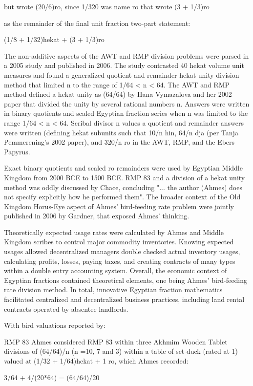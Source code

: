 \documentclass[12pt]{article}
\begin{document}
but wrote (20/6)ro, since 1/320 was name ro that wrote (3 + 1/3)ro

as the remainder of the final unit fraction two-part statement:

(1/8 + 1/32)hekat + (3 + 1/3)ro

The non-additive aspects of the AWT and RMP division problems were parsed in a 2005 study and published in 2006. The study contrasted 40 hekat volume unit measures and found a generalized quotient and remainder hekat unity division method that limited n to the range of 1/64 < n < 64. The AWT and RMP method defined a hekat unity as (64/64) by Hana Vymazalova and her 2002 paper that divided the unity by several rational numbers n. Answers were written in binary quotients and scaled Egyptian fraction series when n was limited to the range 1/64 < n < 64. Scribal divisor n values a quotient and remainder answers were written (defining hekat subunits such that 10/n hin, 64/n dja (per Tanja Pemmerening's 2002 paper), and 320/n ro in the AWT, RMP, and the Ebers Papyrus.

Exact binary quotients and scaled ro remainders were used by Egyptian Middle Kingdom from 2000 BCE to 1500 BCE. RMP 83 and a division of a hekat unity method was oddly discussed by Chace, concluding "... the author (Ahmes) does not specify explicitly how he performed them". The broader context of the Old Kingdom Horus-Eye aspect of Ahmes' bird-feeding rate problem were jointly published in 2006 by Gardner, that exposed Ahmes' thinking.

Theoretically expected usage rates were calculated by Ahmes and Middle Kingdom scribes to control major commodity inventories. Knowing expected usages allowed decentralized managers double checked actual inventory usages, calculating profits, losses, paying taxes, and creating contracts of many types within a double entry accounting system. Overall, the economic context of Egyptian fractions contained theoretical elements, one being Ahmes' bird-feeding rate division method. In total, innovative Egyptian fraction mathematics facilitated centralized and decentralized business practices, including land rental contracts operated by absentee landlords.

With bird valuations reported by:

RMP 83 Ahmes considered RMP 83 within three Akhmim Wooden Tablet divisions of (64/64)/n (n =10, 7 and 3) within a  table of set-duck (rated at 1) valued at (1/32 + 1/64)hekat + 1 ro, which Ahmes recorded:

3/64 + 4/(20*64) = (64/64)/20
\end{document}
